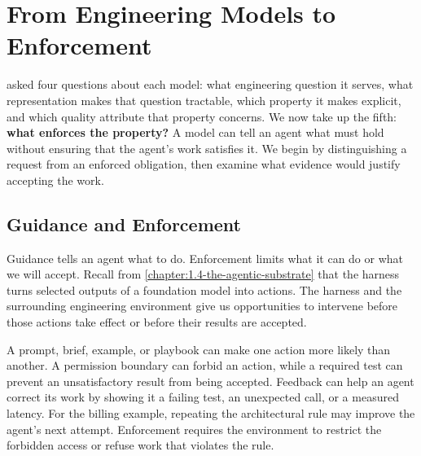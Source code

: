 


\chapter{From Engineering Models to Enforcement}

 asked four questions about each model: what engineering question it serves, what representation makes that question tractable, which property it makes explicit, and which quality attribute that property concerns. We now take up the fifth: \textbf{what enforces the property?} A model can tell an agent what must hold without ensuring that the agent's work satisfies it. We begin by distinguishing a request from an enforced obligation, then examine what evidence would justify accepting the work.

\section{Guidance and Enforcement}\label{heading:guidance-and-enforcement}



Guidance tells an agent what to do. Enforcement limits what it can do or what we will accept. Recall from \cref{chapter:1.4-the-agentic-substrate} that the harness turns selected outputs of a foundation model into actions. The harness and the surrounding engineering environment give us opportunities to intervene before those actions take effect or before their results are accepted.

A prompt, brief, example, or playbook can make one action more likely than another. A permission boundary can forbid an action, while a required test can prevent an unsatisfactory result from being accepted. Feedback can help an agent correct its work by showing it a failing test, an unexpected call, or a measured latency. For the billing example, repeating the architectural rule may improve the agent's next attempt. Enforcement requires the environment to restrict the forbidden access or refuse work that violates the rule.


